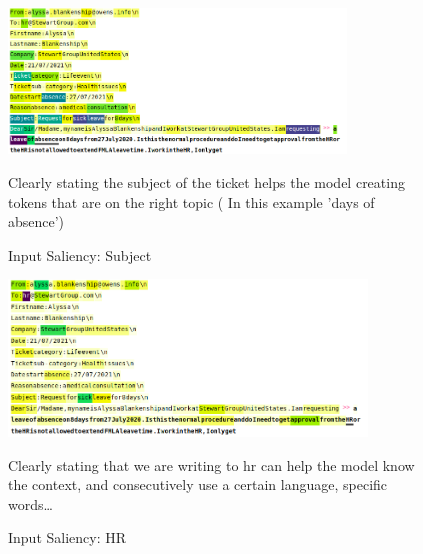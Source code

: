 \begin{figure}[h!] 
    \includegraphics[width=0.8\textwidth]{images/Screenshot from 2022-11-26 18-18-28}
    \caption{Input Saliency: Subject}
    \medskip
    \footnotesize	
    Clearly stating the subject of the ticket helps the model creating tokens that are on the right topic ( In this example 'days of absence')
    \label{fig:topic}
\end{figure}    

\begin{figure}[h!] 
    \includegraphics[width=0.85\textwidth]{images/Screenshot from 2022-11-26 18-18-40.png}
    \caption{Input Saliency: HR}
    \medskip
    \footnotesize
    Clearly stating that we are writing to hr can help the model know the context, and consecutively use a certain language, specific words\dots
    \label{fig:hr}
\end{figure}    


